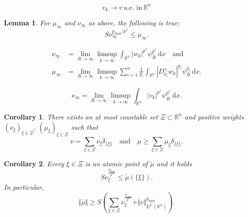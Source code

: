 \documentclass[10pt,a4paper]{amsart}
\newtheorem{lemma}{Lemma}
\newtheorem{corollary}{Corollary}
\newcommand{\R}{\mathbb{R}}
\begin{document}
\begin{equation} \label{eq:conv_ptwise}
v_k \to v ~ \text{a.e. in}~ \mathbb{R}^n
\end{equation}

\begin{lemma}\label{lem:inftyrevHolder} 
For $\mu_{\infty}$ and $\nu_{\infty}$ as above, the following is true:
\[S\nu_{\infty}^{p_{\max}/p^{\ast}} \leq \mu_{\infty}.\]
\end{lemma}

\begin{align}
\label{eq:nuChar}
\nu_{\infty} &= \lim_{R \to \infty} \limsup_{k \to \infty} \int_{\mathbb{R}^n} |w_k|^{p^{\ast}} \psi_R^{p^{\ast}} \,\mathrm{d}x \quad\text{and}\\
\label{eq:muChar}
\mu_{\infty} &= \lim_{R \to \infty} \limsup_{k \to \infty} \sum_{i=1}^n \frac{1}{p_i} \int_{\mathbb{R}^n} |D^{s_i}_{p_i}w_k|^{p_i} \psi_R^{p_i} \,\mathrm{d}x.
\end{align}

\begin{equation}
\label{eq:nuinftyrep1}
\nu_{\infty} = \lim_{R \to \infty} \limsup_{k \to \infty} \int_{\mathbb{R}^n} |v_k|^{p^{\ast}} \psi_R^{p^{\ast}} \,\mathrm{d}x.
\end{equation}

\begin{corollary}
\label{cor:CC}
There exists an at most countable set $\Xi \subset \R^n$ and positive weights $(\nu_{\xi})_{\xi \in \Xi}$, $(\mu_{\xi})_{\xi \in \Xi}$ such that
\begin{equation*}
\nu = \sum_{\xi \in \Xi} \nu_{\xi}\delta_{\{\xi\}} \quad\text{and}\quad \mu \ge \sum_{\xi \in \Xi} \mu_{\xi}\delta_{\{\xi\}}.
\end{equation*}
\end{corollary}

\begin{corollary}
\label{cor:CC2}
Every $\xi \in \Xi$ is an atomic point of $\widetilde{\mu}$ and it holds
\begin{equation}
\label{eq:finallemmaHelp2}
S \nu_{\xi}^{\frac{p_{\max}}{p^{\ast}}} \le \widetilde{\mu}(\{\xi\}).
\end{equation}
In particular,
\begin{equation*}
\Vert \widetilde{\mu} \Vert \ge S \left(\sum_{\xi \in \Xi} \nu_{\xi}^{\frac{p_{\max}}{p^{\ast}}} +  \Vert v \Vert_{L^{p^{\ast}}(\R^n)}^{p_{\max}}\right).
\end{equation*}
\end{corollary}
\end{document}
